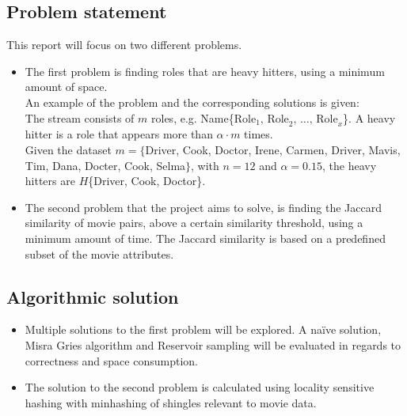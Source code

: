\subsection{Problem statement}
	This report will focus on two different problems.
\begin{itemize}
	\item The first problem is finding roles that are heavy hitters, using a minimum amount of space. \\ %
	An example of the problem and the corresponding solutions is given: \\
	The stream consists of \(m\) roles, e.g. Name\{\(\textrm{Role}_1 \textrm{, Role}_2 \textrm{, } \dots \textrm{, Role}_x\)\}. A heavy hitter is a role that appears more than \(\alpha \cdot m\) times. \\
	Given the dataset \(m = \{\)Driver, Cook, Doctor, Irene, Carmen, Driver, Mavis, Tim, Dana, Docter, Cook, Selma\(\}\), with \(n=12\) and \(\alpha=0.15\), the heavy hitters are \(H\)\{Driver, Cook, Doctor\}.
	\item The second problem that the project aims to solve, is finding the Jaccard similarity of movie pairs, above a certain similarity threshold, using a minimum amount of time. The Jaccard similarity is based on a predefined subset of the movie attributes.
	
\end{itemize}

\subsection{Algorithmic solution}
\begin{itemize}
	\item Multiple solutions to the first problem will be explored. A naïve solution, Misra Gries algorithm and Reservoir sampling will be evaluated in regards to correctness and space consumption.
	\item The solution to the second problem is calculated using locality sensitive hashing with minhashing of shingles relevant to movie data.
\end{itemize}

